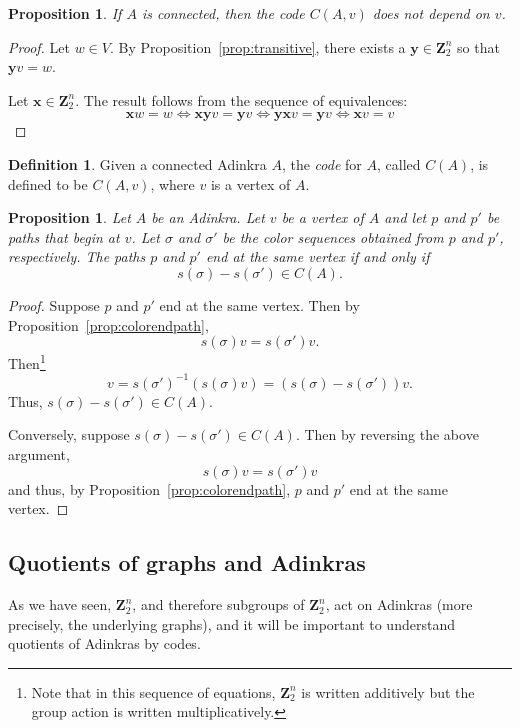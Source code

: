 \documentclass[12pt,twoside,singlespace]{article}
\numberwithin{equation}{section}
\newtheorem{prop}[equation]{Proposition}
\theoremstyle{definition}
\newtheorem{definition}[equation]{Definition}
\newcommand{\ZZ}{\mathbf{Z}}
\renewcommand{\vec}[1]{\mathbf{#1}}
\begin{document}
\begin{prop}
If $A$ is connected, then the code $C(A,v)$ does not depend on $v$.
\end{prop}
\begin{proof}
Let $w\in V$.  By Proposition~\ref{prop:transitive}, there exists a $\vec{y}\in \ZZ_2^n$ so that $\vec{y} v=w$.

Let $\vec{x}\in \ZZ_2^n$.  The result follows from the sequence of equivalences:
\[\vec{x} w=w\Leftrightarrow \vec{x}\vec{y} v=\vec{y} v \Leftrightarrow \vec{y} \vec{x} v=\vec{y} v \Leftrightarrow \vec{x} v=v\]
\end{proof}

\begin{definition}
Given a connected Adinkra $A$, the \emph{code} for $A$, called $C(A)$, is defined to be $C(A,v)$, where $v$ is a vertex of $A$.
\end{definition}




\begin{prop}
\label{prop:paths}
Let $A$ be an Adinkra.  Let $v$ be a vertex of $A$ and let $p$ and $p'$ be paths that begin at $v$.  Let $\sigma$ and $\sigma'$ be the color sequences obtained from $p$ and $p'$, respectively.  The paths $p$ and $p'$ end at the same vertex if and only if 
\[s(\sigma)-s(\sigma')\in C(A).\]
\end{prop}

\begin{proof}
Suppose $p$ and $p'$ end at the same vertex.  Then by Proposition~\ref{prop:colorendpath},
\[s(\sigma)v=s(\sigma')v.\]
Then\footnote{Note that in this sequence of equations, $\ZZ_2^n$ is written additively but the group action is written multiplicatively.}
\[v=s(\sigma')^{-1}(s(\sigma)v)=(s(\sigma)-s(\sigma'))v.\]
Thus, $s(\sigma)-s(\sigma')\in C(A)$.

Conversely, suppose $s(\sigma)-s(\sigma')\in C(A)$.  Then by reversing the above argument,
\[s(\sigma)v=s(\sigma')v\]
and thus, by Proposition~\ref{prop:colorendpath}, $p$ and $p'$ end at the same vertex.
\end{proof}

\subsection{Quotients of graphs and Adinkras}
\label{sec:quotient}
As we have seen, $\ZZ_2^n$, and therefore subgroups of $\ZZ_2^n$, act on Adinkras (more precisely, the underlying graphs), and it will be important to understand quotients of Adinkras by codes.
\end{document}
